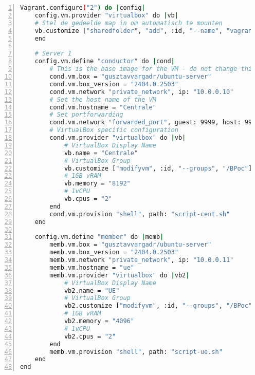 \section{}
\begin{lstlisting}[basicstyle=\small, frame=single, breaklines=true, postbreak=\mbox{\textcolor{red}{$\hookrightarrow$}\space}, escapeinside ={\%,}, escapechar={!}, numbers=left, language=sh, caption=Vagrantfile]
Vagrant.configure("2") do |config|
    config.vm.provider "virtualbox" do |vb|
    # Stel de gedeelde map in om automatisch te mounten
    vb.customize ["sharedfolder", "add", :id, "--name", "vagrant_data", "--hostpath", ".", "--automount"]
    end

    # Server 1
    config.vm.define "conductor" do |cond|
        # This is the base image for the VM - do not change this!
        cond.vm.box = "gusztavvargadr/ubuntu-server"
        cond.vm.box_version = "2404.0.2503"
        cond.vm.network "private_network", ip: "10.0.0.10"
        # Set the host name of the VM
        cond.vm.hostname = "Centrale"
        # Set portforwarding
        cond.vm.network "forwarded_port", guest: 9999, host: 9999, host_ip: "127.0.0.1", id: "open5gs"
        # VirtualBox specific configuration
        cond.vm.provider "virtualbox" do |vb|
            # VirtualBox Display Name
            vb.name = "Centrale"
            # VirtualBox Group
            vb.customize ["modifyvm", :id, "--groups", "/BPoc"]
            # 1GB vRAM
            vb.memory = "8192"
            # 1vCPU
            vb.cpus = "2"
        end
        cond.vm.provision "shell", path: "script-cent.sh"
    end

    config.vm.define "member" do |memb|
        memb.vm.box = "gusztavvargadr/ubuntu-server"
        memb.vm.box_version = "2404.0.2503"
        memb.vm.network "private_network", ip: "10.0.0.11"
        memb.vm.hostname = "ue"
        memb.vm.provider "virtualbox" do |vb2|
            # VirtualBox Display Name
            vb2.name = "UE"
            # VirtualBox Group
            vb2.customize ["modifyvm", :id, "--groups", "/BPoc"]
            # 1GB vRAM
            vb2.memory = "4096"
            # 1vCPU
            vb2.cpus = "2"
        end
        memb.vm.provision "shell", path: "script-ue.sh"
    end
end
\end{lstlisting}

\section{}

